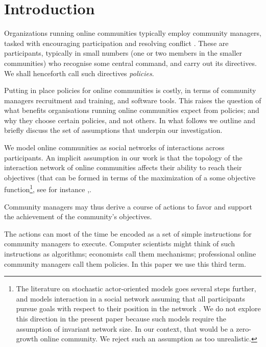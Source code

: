 \documentclass{bmcart}
\begin{document}



\section{Introduction}
\label{intro}
Organizations running online communities typically employ community managers, tasked with encouraging participation and resolving conflict \cite{rheingold1993virtual}. 
These are participants, typically in small numbers (one or two members in the smaller communities) who recognise some central command, and carry out its directives. We shall henceforth call such directives \emph{policies}. 

Putting in place policies for online communities is costly, in terms of community managers recruitment and training, and software tools. This raises the question of what benefits organisations running online communities expect from policies; and why they choose certain policies, and not others. In what follows we outline and briefly discuss the set of assumptions that underpin our investigation.

We model online communities as social networks of interactions across participants. An implicit assumption in our work is that the topology of the interaction network of online communities affects their ability to reach their objectives (that can be formed in terms of the maximization of a some objective function\footnote{The literature on stochastic actor-oriented models goes several steps further, and models interaction in a social network assuming that all participants pursue goals with respect to their position in the network \cite{snijders1996stochastic}. We do not explore this direction in the present paper because such models require the assumption of invariant network size. In our context, that would be a zero-growth online community. We reject such an assumption as too unrealistic.}, see for instance \cite{tapscott2008wikinomics},\cite{slegg2014facebook}.

Community managers may thus derive a course of actions to favor and support the achievement of the community's objectives. 

The actions can most of the time be encoded as a set of simple instructions for community managers to execute. Computer scientists might think of such instructions as algorithms; economists call them mechanisms; professional online community managers call them policies. In this paper we use this third term.
\end{document}
